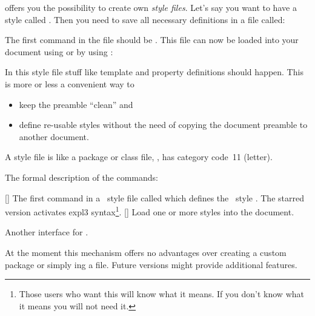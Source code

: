 \documentclass{xsim-manual}
\begin{document}
\xsim{} offers you the possibility to create own
\emph{style files}.  Let's say you want to have a style called
.  Then you need to save all necessary definitions in a file
called:
\begin{center}
\end{center}
The first command in the file should be .  This
file can now be loaded into your document using
 or by using
:

In this style file stuff like template and property definitions should
happen.  This is more or less a convenient way to
\begin{itemize}
  \item keep the preamble \enquote{clean} and
  \item define re-usable styles without the need of copying the document
    preamble to another document.
\end{itemize}
A style file is like a package or class file, \ie,  has category
code~11 (letter).

The formal description of the commands:
\begin{commands}
  [\sarg{}]
    The first command in a \xsim\ style file called
     which defines the \xsim\
    style .  The starred version activates expl3
    syntax\footnote{Those users who want this will know what it means.  If you
      don't know what it means you will not need it.}.
  []
    Load one or more styles into the document.
\end{commands}
\begin{options}
    Another interface for \marg{csv list
      of style names}.
\end{options}

\begin{bewareofthedog}
  At the moment this mechanism offers no advantages over creating a custom
  package or simply \cs*{input}ing a file.  Future versions might provide
  additional features.
\end{bewareofthedog}
\end{document}
